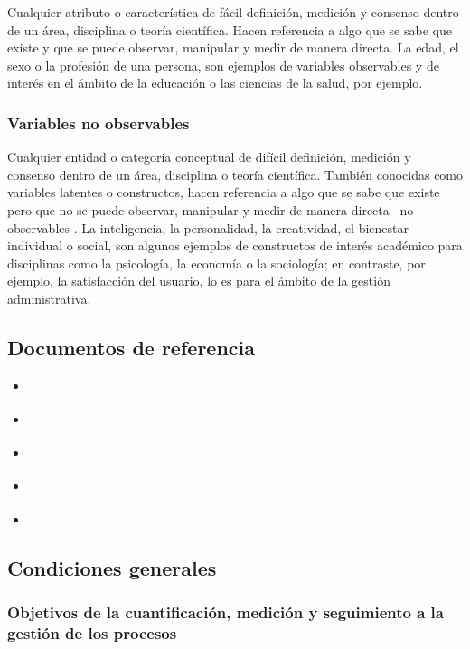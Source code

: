 \documentclass[
]{book}
\providecommand{\tightlist}{%
  \setlength{\itemsep}{0pt}\setlength{\parskip}{0pt}}
\begin{document}
Cualquier atributo o característica de fácil definición, medición y consenso dentro de un área, disciplina o teoría científica. Hacen referencia a algo que se sabe que existe y que se puede observar, manipular y medir de manera directa. La edad, el sexo o la profesión de una persona, son ejemplos de variables observables y de interés en el ámbito de la educación o las ciencias de la salud, por ejemplo.

\hypertarget{variables-no-observables}{%
\subsubsection{Variables no observables}\label{variables-no-observables}}

Cualquier entidad o categoría conceptual de difícil definición, medición y consenso dentro de un área, disciplina o teoría científica. También conocidas como variables latentes o constructos, hacen referencia a algo que se sabe que existe pero que no se puede observar, manipular y medir de manera directa --no observables-. La inteligencia, la personalidad, la creatividad, el bienestar individual o social, son algunos ejemplos de constructos de interés académico para disciplinas como la psicología, la economía o la sociología; en contraste, por ejemplo, la satisfacción del usuario, lo es para el ámbito de la gestión administrativa.

\hypertarget{documentos-de-referencia}{%
\subsection{Documentos de referencia}\label{documentos-de-referencia}}

\begin{itemize}
\tightlist
\item
  \citet{bonnefoy2005indicadores}
\item
  \citet{coneval2013manual}
\item
  \citet{sanchez2018guia}
\item
  \citet{dane2014guia}
\item
  \citet{publica2015guia}
\end{itemize}

\hypertarget{condiciones-generales}{%
\subsection{Condiciones generales}\label{condiciones-generales}}

\hypertarget{objetivos-de-la-cuantificaciuxf3n-mediciuxf3n-y-seguimiento-a-la-gestiuxf3n-de-los-procesos}{%
\subsubsection{Objetivos de la cuantificación, medición y seguimiento a la gestión de los procesos}\label{objetivos-de-la-cuantificaciuxf3n-mediciuxf3n-y-seguimiento-a-la-gestiuxf3n-de-los-procesos}}
\end{document}
